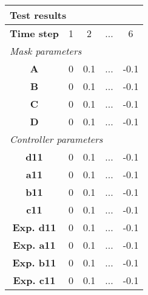 \vspace{1em}
\begin{tabularx}{\textwidth}{|c|c|c|>{\centering\arraybackslash}X|c|}
\hline
\multicolumn{5}{|l|}{\cellcolor[gray]{0.8}\textbf{Test results}} \tabularnewline \hline
\textbf{Time step} & 1 & 2 & ... & 6 \tabularnewline \hline
\multicolumn{5}{|l|}{\cellcolor[gray]{0.9}\textit{Mask parameters}} \tabularnewline \hline
\textbf{A} & 0 & 0.1 & ... & -0.1 \tabularnewline \hline
\textbf{B} & 0 & 0.1 & ... & -0.1 \tabularnewline \hline
\textbf{C} & 0 & 0.1 & ... & -0.1 \tabularnewline \hline
\textbf{D} & 0 & 0.1 & ... & -0.1 \tabularnewline \hline
\multicolumn{5}{|l|}{\cellcolor[gray]{0.9}\textit{Controller parameters}} \tabularnewline \hline
\textbf{d11} & 0 & 0.1 & ... & -0.1 \tabularnewline \hline
\textbf{a11} & 0 & 0.1 & ... & -0.1 \tabularnewline \hline
\textbf{b11} & 0 & 0.1 & ... & -0.1 \tabularnewline \hline
\textbf{c11} & 0 & 0.1 & ... & -0.1 \tabularnewline \hline
\textbf{Exp. d11} & 0 & 0.1 & ... & -0.1 \tabularnewline \hline
\textbf{Exp. a11} & 0 & 0.1 & ... & -0.1 \tabularnewline \hline
\textbf{Exp. b11} & 0 & 0.1 & ... & -0.1 \tabularnewline \hline
\textbf{Exp. c11} & 0 & 0.1 & ... & -0.1 \tabularnewline \hline
\end{tabularx}
\vspace{1ex}
